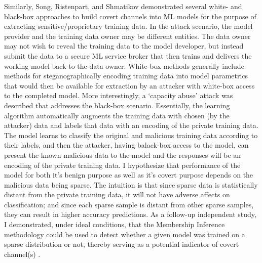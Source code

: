 \documentclass[11pt]{article}
\begin{document}
Similarly, Song, Ristenpart, and Shmatikov demonstrated several white- and black-box approaches to build covert channels into ML models for the purpose of extracting sensitive/proprietary training data.  In the attack scenario, the model provider and the training data owner may be different entities.  The data owner may not wish to reveal the training data to the model developer, but instead submit the data to a secure ML service broker that then trains and delivers the working model back to the data owner.  White-box methods generally include methods for steganographically encoding training data into model parametrics that would then be available for extraction by an attacker with white-box access to the completed model.  More interestingly, a `capacity abuse' attack was described that addresses the black-box scenario.  Essentially, the learning algorithm automatically augments the training data with chosen (by the attacker) data and labels that data with an encoding of the private training data.  The model learns to classify the original and malicious training data according to their labels, and then the attacker, having balack-box access to the model, can present the known malicious data to the model and the responses will be an encoding of the private training data.  I hypothesize that performance of the model for both it's benign purpose as well as it's covert purpose depends on the malicious data being sparse.  The intuition is that since sparse data is statistically distant from the private training data, it will not have adverse affects on classification; and since each sparse sample is distant from other sparse samples, they can result in higher accuracy predictions.  As a follow-up independent study, I demonstrated, under ideal conditions, that the Membership Inference \cite{shokri2017membership} methodology could be used to detect whether a given model was trained on a sparse distribution or not, thereby serving as a potential indicator of covert channel(s) \cite{stein2018covert}.


\newpage


\end{document}

